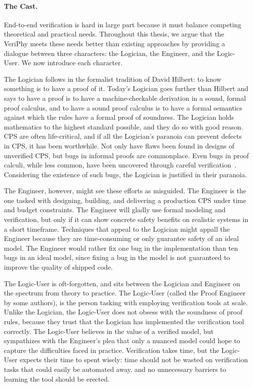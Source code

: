 \documentclass[12pt]{cmuthesis}
\theoremstyle{definition}
\theoremstyle{remark}
\newcommand{\VeriPhy}{VeriPhy\xspace}
\begin{document}
\paragraph{The Cast.}
End-to-end verification is hard in large part because it must balance competing theoretical and practical needs.
Throughout this thesis, we argue that the \VeriPhy meets these needs better than existing approaches by providing a dialogue between three characters: the Logician, the Engineer, and the Logic-User.
We now introduce each character.

The Logician follows in the formalist tradition of David Hilbert: to know something is to have a proof of it.
Today's Logician goes further than Hilbert and says to have a proof is to have a machine-checkable derivation in a sound, formal proof calculus, and to have a sound proof calculus is to have a formal semantics against which the rules have a formal proof of soundness.
The Logician holds mathematics to the highest standard possible, and they do so with good reason.
CPS are often life-critical, and if all the Logician's paranoia can prevent defects in CPS, it has been worthwhile.
Not only have flaws been found in designs of unverified CPS, but bugs in informal proofs are commonplace.
Even bugs in proof calculi, while less common, have been uncovered through careful verification~\cite{DBLP:conf/cpp/BohrerRVVP17}.
Considering the existence of such bugs, the Logician is justified in their paranoia.

The Engineer, however, might see these efforts as misguided.
The Engineer is the one tasked with designing, building, and delivering a production CPS under time and budget constraints.
The Engineer will gladly use formal modeling and verification, but only if it can show concrete safety benefits on realistic systems in a short timeframe.
Techniques that appeal to the Logician might appall the Engineer because they are time-consuming or only guarantee safety of an ideal model.
The Engineer would rather fix one bug in the implementation than ten bugs in an ideal model, since fixing a bug in the model is not guaranteed to improve the quality of shipped code.

The Logic-User is oft-forgotten, and sits between the Logician and Engineer on the spectrum from theory to practice.
The Logic-User (called the Proof Engineer by some authors), is the person tasking with employing verification tools at scale.
Unlike the Logician, the Logic-User does not obsess with the soundness of proof rules, because they trust that the Logician has implemented the verification tool correctly.
The Logic-User believes in the value of a verified model, but sympathizes with the Engineer's plea that only a nuanced model could hope to capture the difficulties faced in practice.
Verification takes time, but the Logic-User expects their time to spent wisely: time should not be wasted on verification tasks that could easily be automated away, and no unnecessary barriers to learning the tool should be erected.
\end{document}
